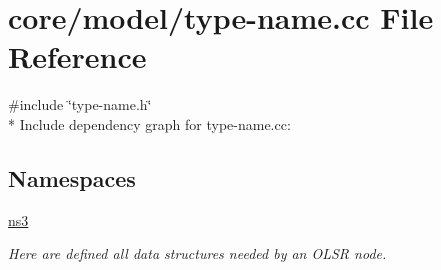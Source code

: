 \hypertarget{type-name_8cc}{}\section{core/model/type-\/name.cc File Reference}
\label{type-name_8cc}
{\ttfamily \#include \char`\"{}type-\/name.\+h\char`\"{}}\\*
Include dependency graph for type-\/name.cc\+:
\subsection*{Namespaces}
\begin{DoxyCompactItemize}
\item 
 \hyperlink{namespacens3}{ns3}
\begin{DoxyCompactList}\small\item\em Here are defined all data structures needed by an O\+L\+SR node. \end{DoxyCompactList}\end{DoxyCompactItemize}
